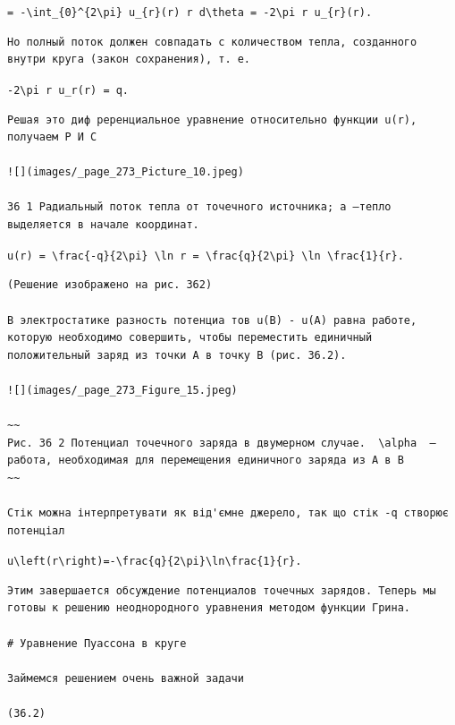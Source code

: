 \documentclass[
  ukrainian,
]{article}
\begin{document}
\texttt{=\ -\textbackslash{}int\_\{0\}\^{}\{2\textbackslash{}pi\}\ u\_\{r\}(r)\ r\ d\textbackslash{}theta\ =\ -2\textbackslash{}pi\ r\ u\_\{r\}(r).}

\begin{verbatim}
Но полный поток должен совпадать с количеством тепла, созданного внутри круга (закон сохранения), т. е.
\end{verbatim}

\texttt{-2\textbackslash{}pi\ r\ u\_r(r)\ =\ q.}

\begin{verbatim}
Решая это диф реренциальное уравнение относительно функции u(r), получаем Р И С

![](images/_page_273_Picture_10.jpeg)

36 1 Радиальный поток тепла от точечного источника; a —тепло выделяется в начале координат.
\end{verbatim}

\texttt{u(r)\ =\ \textbackslash{}frac\{-q\}\{2\textbackslash{}pi\}\ \textbackslash{}ln\ r\ =\ \textbackslash{}frac\{q\}\{2\textbackslash{}pi\}\ \textbackslash{}ln\ \textbackslash{}frac\{1\}\{r\}.}

\begin{verbatim}
(Решение изображено на рис. 362)

В электростатике разность потенциа тов u(B) - u(A) равна работе, которую необходимо совершить, чтобы переместить единичный положительный заряд из точки A в точку B (рис. 36.2).

![](images/_page_273_Figure_15.jpeg)

~~
Рис. 36 2 Потенциал точечного заряда в двумерном случае.  \alpha  — работа, необходимая для перемещения единичного заряда из A в B
~~

Стік можна інтерпретувати як від'ємне джерело, так що стік -q створює потенціал
\end{verbatim}

\texttt{u\textbackslash{}left(r\textbackslash{}right)=-\textbackslash{}frac\{q\}\{2\textbackslash{}pi\}\textbackslash{}ln\textbackslash{}frac\{1\}\{r\}.}

\begin{verbatim}
Этим завершается обсуждение потенциалов точечных зарядов. Теперь мы готовы к решению неоднородного уравнения методом функции Грина.

# Уравнение Пуассона в круге

Займемся решением очень важной задачи

(36.2)
\end{verbatim}
\end{document}
